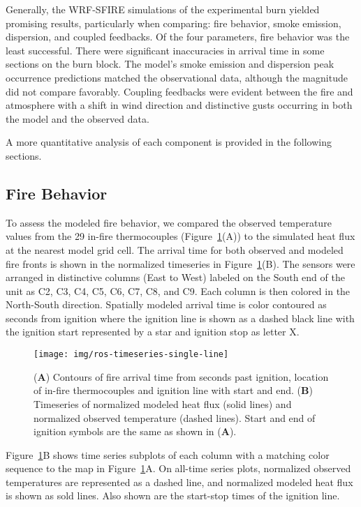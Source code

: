 \documentclass[preprints,article,accept,moreauthors,pdftex]{Definitions/mdpi}
\begin{document}
Generally, the WRF-SFIRE simulations of the experimental burn yielded promising results, particularly when comparing: fire behavior, smoke emission, dispersion, and coupled feedbacks. Of the four parameters, fire behavior was the least successful. There were significant inaccuracies in arrival time in some sections on the burn block. The model’s smoke emission and dispersion peak occurrence predictions matched the observational data, although the magnitude did not compare favorably.
Coupling feedbacks were evident between the fire and atmosphere with a shift in wind direction and distinctive gusts occurring in both the model and the observed data.

A more quantitative analysis of each component is provided in the following sections.

\subsection{Fire Behavior}

To assess the modeled fire behavior, we compared the observed temperature values from the 29 in-fire thermocouples (Figure~\ref{fig2}(A)) to the simulated heat flux at the nearest model grid cell. The arrival time for both observed and modeled fire fronts is shown in the normalized timeseries in Figure~\ref{fig2}(B).
The sensors were arranged in distinctive columns (East to West) labeled on the South end of the unit as C2, C3, C4, C5, C6, C7, C8, and C9. Each column is then colored in the North-South direction. Spatially modeled arrival time is color contoured as seconds from ignition where the ignition line is shown as a dashed black line with the ignition start represented by a star and ignition stop as letter X.

\begin{figure}[H]
\centering
 \texttt{[image: img/ros-timeseries-single-line]}
 \caption{(\textbf{A}) Contours of fire arrival time from seconds past ignition, location of in-fire thermocouples and ignition line with start and end. (\textbf{B}) Timeseries of normalized modeled heat flux (solid lines) and normalized observed temperature (dashed lines). Start and end of ignition symbols are the same as shown in (\textbf{A}). \label{fig2}}
 \end{figure}

Figure~\ref{fig2}B shows time series subplots of each column with a matching color sequence to the map in Figure~\ref{fig2}A. On all-time series plots, normalized observed temperatures are represented as a dashed line, and normalized modeled heat flux is shown as sold lines. Also shown are the start-stop times of the ignition line.
\end{document}
